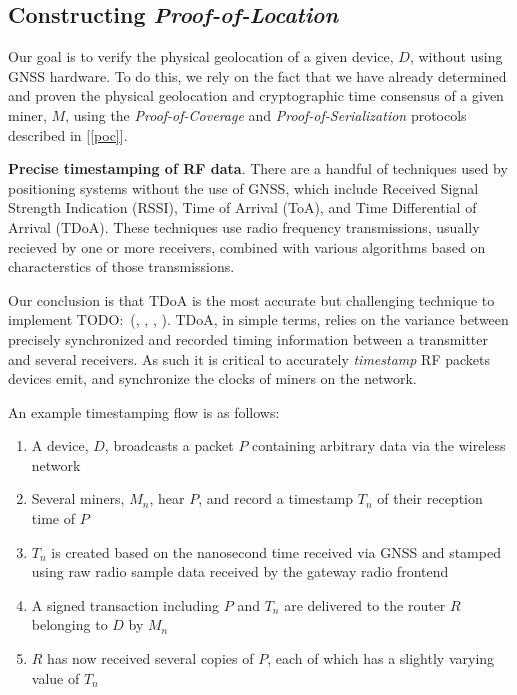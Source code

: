 \documentclass[UTF8, 10pt, nonatbib, nocopyrightspace, reprint]{sigplanconf}
\newcommand{\todo}[1]{}
\renewcommand{\todo}[1]{{\color{red} TODO:\ {#1}}}
\newcommand{\secref}[1]{[\autoref{#1}]}
\begin{document}
\subsection{Constructing \emph{Proof-of-Location}}

Our goal is to verify the physical geolocation of a given device, $D$, without using GNSS hardware. To do this, we rely on the fact that we have already determined and proven the physical geolocation and cryptographic time consensus of a given miner, $M$, using the \emph{Proof-of-Coverage} and \emph{Proof-of-Serialization} protocols described in \secref{poc}. 

\textbf{Precise timestamping of RF data}. There are a handful of techniques used by positioning systems without the use of GNSS, which include Received Signal Strength Indication (RSSI), Time of Arrival (ToA), and Time Differential of Arrival (TDoA). These techniques use radio frequency transmissions, usually recieved by one or more receivers, combined with various algorithms based on characterstics of those transmissions.

Our conclusion is that TDoA is the most accurate but challenging technique to implement \todo{(\cite{}, \cite{}, \cite{}, \cite{})}. TDoA, in simple terms, relies on the variance between precisely synchronized and recorded timing information between a transmitter and several receivers. As such it is critical to accurately \emph{timestamp} RF packets devices emit, and synchronize the clocks of miners on the network.

An example timestamping flow is as follows:

\begin{enumerate}
        \item A device, $D$, broadcasts a packet $P$ containing arbitrary data via the wireless network
        \item Several miners, $M_n$, hear $P$, and record a timestamp $T_n$ of their reception time of $P$
        \item $T_n$ is created based on the nanosecond time received via GNSS and stamped using raw radio sample data received by the gateway radio frontend
        \item A signed transaction including $P$ and $T_n$ are delivered to the router $R$ belonging to $D$ by $M_n$
        \item $R$ has now received several copies of $P$, each of which has a slightly varying value of $T_n$
\end{enumerate}
\end{document}
